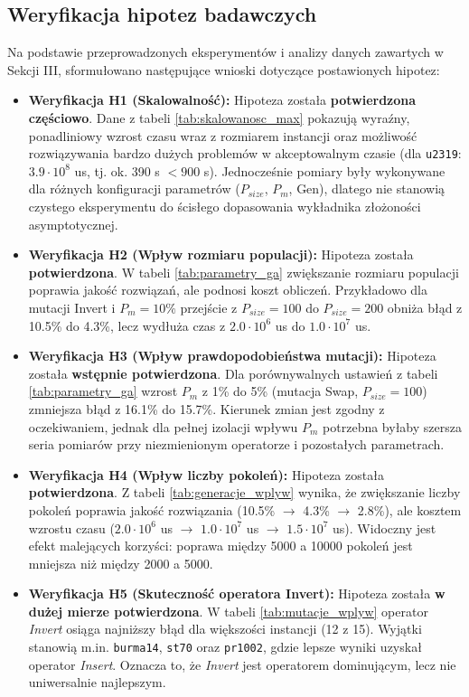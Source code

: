 \documentclass[conference]{IEEEtran}
\begin{document}
        \subsection{Weryfikacja hipotez badawczych}
            Na podstawie przeprowadzonych eksperymentów i analizy danych zawartych w Sekcji III, sformułowano następujące wnioski dotyczące postawionych hipotez:
            \begin{itemize}
                \item \textbf{Weryfikacja H1 (Skalowalność):} Hipoteza została \textbf{potwierdzona częściowo}. Dane z tabeli \ref{tab:skalowanosc_max} pokazują wyraźny, ponadliniowy wzrost czasu wraz z rozmiarem instancji oraz możliwość rozwiązywania bardzo dużych problemów w akceptowalnym czasie (dla \texttt{u2319}: $3.9 \cdot 10^{8}$ us, tj. ok. 390 s $< 900$ s). Jednocześnie pomiary były wykonywane dla różnych konfiguracji parametrów ($P_{size}$, $P_m$, Gen), dlatego nie stanowią czystego eksperymentu do ścisłego dopasowania wykładnika złożoności asymptotycznej.
                \item \textbf{Weryfikacja H2 (Wpływ rozmiaru populacji):} Hipoteza została \textbf{potwierdzona}. W tabeli \ref{tab:parametry_ga} zwiększanie rozmiaru populacji poprawia jakość rozwiązań, ale podnosi koszt obliczeń. Przykładowo dla mutacji Invert \linebreak i $P_m=10\%$ przejście z $P_{size}=100$ do $P_{size}=200$ obniża błąd z 10.5\% do 4.3\%, lecz wydłuża czas \linebreak z $2.0 \cdot 10^{6}$ us do $1.0 \cdot 10^{7}$ us.
                \item \textbf{Weryfikacja H3 (Wpływ prawdopodobieństwa mutacji):} Hipoteza została \textbf{wstępnie potwierdzona}. Dla porównywalnych ustawień z tabeli \ref{tab:parametry_ga} wzrost $P_m$ z 1\% do 5\% (mutacja Swap, $P_{size}=100$) zmniejsza błąd z 16.1\% do 15.7\%. Kierunek zmian jest zgodny z oczekiwaniem, jednak dla pełnej izolacji wpływu $P_m$ potrzebna byłaby szersza seria pomiarów przy niezmienionym operatorze \linebreak i pozostałych parametrach.
                \item \textbf{Weryfikacja H4 (Wpływ liczby pokoleń):} Hipoteza została \textbf{potwierdzona}. Z tabeli \ref{tab:generacje_wplyw} wynika, że zwiększanie liczby pokoleń poprawia jakość rozwiązania (10.5\% $\rightarrow$ 4.3\% $\rightarrow$ 2.8\%), ale kosztem wzrostu czasu ($2.0 \cdot 10^{6}$ us $\rightarrow$ $1.0 \cdot 10^{7}$ us $\rightarrow$ $1.5 \cdot 10^{7}$ us). Widoczny jest efekt malejących korzyści: poprawa między 5000 a 10000 pokoleń jest mniejsza niż między 2000 a 5000.
                \item \textbf{Weryfikacja H5 (Skuteczność operatora Invert):} Hipoteza została \textbf{w dużej mierze potwierdzona}. W tabeli \ref{tab:mutacje_wplyw} operator \textit{Invert} osiąga najniższy błąd dla większości instancji (12 z 15). Wyjątki stanowią m.in. \texttt{burma14}, \texttt{st70} oraz \texttt{pr1002}, gdzie lepsze wyniki uzyskał operator \textit{Insert}. Oznacza to, że \textit{Invert} jest operatorem dominującym, lecz nie uniwersalnie najlepszym.
            \end{itemize}
\end{document}
